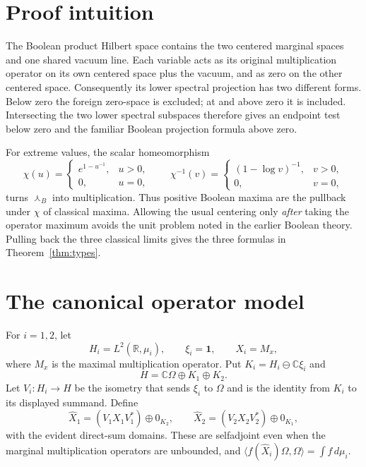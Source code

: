 \documentclass[11pt]{article}
\newcommand{\Bmeet}{\mathbin{\curlywedge_{\!B}}}
\newcommand{\one}{\mathbf 1}
\begin{document}
\section{Proof intuition}

The Boolean product Hilbert space contains the two centered marginal spaces
and one shared vacuum line.  Each variable acts as its original multiplication
operator on its own centered space plus the vacuum, and as zero on the other
centered space.  Consequently its lower spectral projection has two different
forms.  Below zero the foreign zero-space is excluded; at and above zero it is
included.  Intersecting the two lower spectral subspaces therefore gives an
endpoint test below zero and the familiar Boolean projection formula above
zero.

For extreme values, the scalar homeomorphism
\[
 \chi(u)=\begin{cases}e^{1-u^{-1}},&u>0,\\0,&u=0,
 \end{cases}
 \qquad \chi^{-1}(v)=\begin{cases}(1-\log v)^{-1},&v>0,\\0,&v=0,
 \end{cases}
\]
turns $\Bmeet$ into multiplication.  Thus positive Boolean maxima are the
pullback under $\chi$ of classical maxima.  Allowing the usual centering only
\emph{after} taking the operator maximum avoids the unit problem noted in the
earlier Boolean theory.  Pulling back the three classical limits gives the
three formulas in Theorem~\ref{thm:types}.

\section{The canonical operator model}

For $i=1,2$, let
\[
 H_i=L^2(\mathbb R,\mu_i),\qquad \xi_i=\one,
 \qquad X_i=M_x,
 \]
where $M_x$ is the maximal multiplication operator.  Put
$K_i=H_i\ominus\mathbb C\xi_i$ and
\[
 H=\mathbb C\Omega\oplus K_1\oplus K_2.
\]
Let $V_i:H_i\to H$ be the isometry that sends $\xi_i$ to $\Omega$ and is the
identity from $K_i$ to its displayed summand.  Define
\begin{equation}\label{eq:copies}
 \widehat X_1=(V_1X_1V_1^*)\oplus 0_{K_2},\qquad
 \widehat X_2=(V_2X_2V_2^*)\oplus 0_{K_1},
\end{equation}
with the evident direct-sum domains.  These are selfadjoint even when the
marginal multiplication operators are unbounded, and
$\langle f(\widehat X_i)\Omega,\Omega\rangle=\int f\,d\mu_i$.
\end{document}

